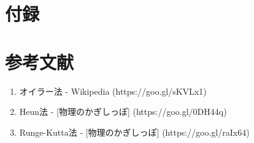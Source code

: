 \documentclass[11pt]{jsarticle}
\begin{document}
    \section{付録}

    \section{参考文献}
        \begin{enumerate}
            \item オイラー法 - Wikipedia (https://goo.gl/sKVLx1)
            \item Heun法 - [物理のかぎしっぽ] (https://goo.gl/0DH44q)
            \item Runge-Kutta法 - [物理のかぎしっぽ] (https://goo.gl/raIx64)
        \end{enumerate}
\end{document}
